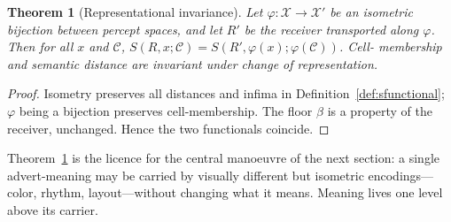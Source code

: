 \documentclass[twocolumn,11pt,a4paper]{article}
\theoremstyle{adv}
\newtheorem{theorem}{Theorem}[section]
\theoremstyle{definition}
\theoremstyle{remark}
\newcommand{\Out}{\mathcal{X}}         %
\newcommand{\Cell}{\mathcal{C}}        %
\newcommand{\Recv}{R}                  %
\newcommand{\Sval}{S}                  %
\newcommand{\floor}{\beta}            %
\begin{document}
\begin{theorem}[Representational invariance]
\label{thm:repinv}
Let $\varphi:\Out\to\Out'$ be an isometric bijection between percept
spaces, and let $\Recv'$ be the receiver transported along $\varphi$. Then
for all $x$ and $\Cell$,
$\Sval(\Recv,x;\Cell)=\Sval(\Recv',\varphi(x);\varphi(\Cell))$. Cell-
membership and semantic distance are invariant under change of
representation.
\end{theorem}

\begin{proof}
Isometry preserves all distances and infima in
Definition~\ref{def:sfunctional}; $\varphi$ being a bijection preserves
cell-membership. The floor $\floor$ is a property of the receiver,
unchanged. Hence the two functionals coincide.
\end{proof}

Theorem~\ref{thm:repinv} is the licence for the central manoeuvre of the
next section: a single advert-meaning may be carried by visually different
but isometric encodings---color, rhythm, layout---without changing what it
means. Meaning lives one level above its carrier.
\end{document}
